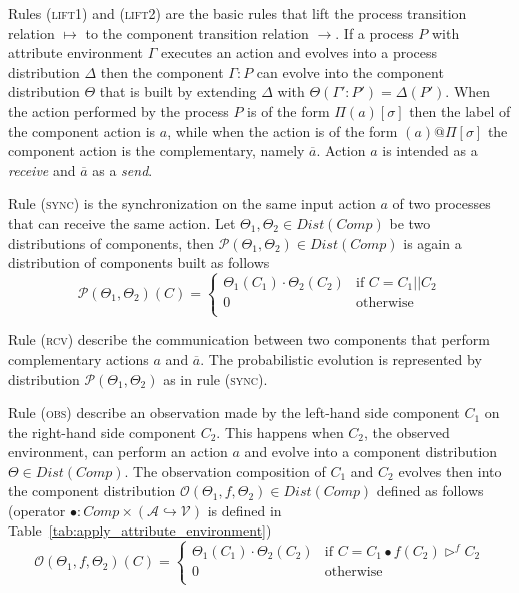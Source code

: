 \documentclass{article}
\theoremstyle{remark}
\begin{document}

Rules \textsc{(lift1)} and \textsc{(lift2)} are the basic rules that lift the process transition relation $\mapsto$ to the component transition relation $\rightarrow$. If a process $P$ with attribute environment $\Gamma$ executes an action and evolves into a process distribution $\Delta$ then the component $\Gamma : P$ can evolve into the component distribution $\Theta$ that is built by extending $\Delta$ with $\Theta(\Gamma' : P') = \Delta(P')$. When the action performed by the process $P$ is of the form $\Pi(a)[\sigma]$ then the label of the component action is $a$, while when the action is of the form $(a)@\Pi[\sigma]$ the component action is the complementary, namely $\overline{a}$. Action $a$ is intended as a \emph{receive} and $\overline{a}$ as a \emph{send}.

Rule \textsc{(sync)} is the synchronization on the same input action $a$ of two processes that can receive the same action. Let $\Theta_1, \Theta_2 \in Dist(Comp)$ be two distributions of components, then $\mathscr{P}(\Theta_1, \Theta_2) \in Dist(Comp)$ is again a distribution of components built as follows
$$
\mathscr{P}(\Theta_1, \Theta_2)(C) = \left\{
\begin{array}{ll}
	\Theta_1(C_1) \cdot \Theta_2(C_2) & \text{if } C = C_1 || C_2 \\
	0 & \text{otherwise} \\
\end{array}
\right.
$$

Rule \textsc{(rcv)} describe the communication between two components that perform complementary actions $a$ and $\overline{a}$. The probabilistic evolution is represented by distribution $\mathscr{P}(\Theta_1, \Theta_2)$ as in rule \textsc{(sync)}. 

Rule \textsc{(obs)} describe an observation made by the left-hand side component $C_1$ on the right-hand side component $C_2$. This happens when $C_2$, the observed environment, can perform an action $a$  and evolve into a component distribution $\Theta \in Dist(Comp)$. The observation composition of $C_1$ and $C_2$ evolves then into the component distribution $\mathscr{O}(\Theta_1,f,\Theta_2) \in Dist(Comp)$ defined as follows (operator $\bullet: Comp \times (\mathcal{A} \hookrightarrow \mathcal{V})$ is defined in Table~\ref{tab:apply_attribute_environment})
$$ 
\mathscr{O}(\Theta_1,f,\Theta_2)(C) = \left\{
\begin{array}{ll}
	\Theta_1(C_1) \cdot \Theta_2(C_2) & \text{if } C = C_1 \bullet f(C_2) \triangleright^f C_2 \\
	0 & \text{otherwise} \\
\end{array}
\right.
$$
\end{document}
